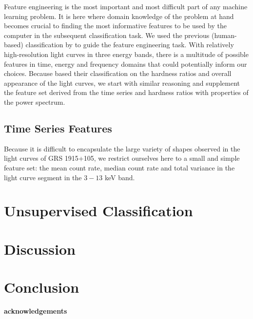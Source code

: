 \documentclass[12pt]{emulateapj}
\begin{document}
Feature engineering is the most important and most difficult part of any machine learning problem. It is here where domain knowledge of the problem at hand becomes crucial to finding the most informative features to be used by the computer in the subsequent classification task. 
We used the previous (human-based) classification by \citet{belloni2000} to guide the feature engineering task. With relatively high-resolution light curves in three energy bands, there is a multitude of possible features in time, energy and frequency domains that could potentially inform our choices. Because \citet{belloni2000} based their classification on the hardness ratios and overall appearance of the light curves, we start with similar reasoning and supplement the feature set derived from the time series and hardness ratios with properties of the power spectrum. 

\subsection{Time Series Features}

Because it is difficult to encapsulate the large variety of shapes observed in the light curves of GRS 1915+105, we restrict ourselves here to a small and simple feature set: the mean count rate, median count rate and total variance in the light curve segment in the $3 - 13$ keV band. 



\section{Unsupervised Classification}


\section{Discussion}


\section{Conclusion}

\paragraph{acknowledgements}

%
%
\end{document}
